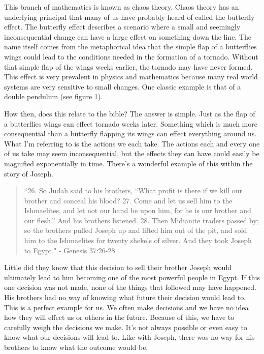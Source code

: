 \documentclass[10pt]{article}
\begin{document}
\begin{multicols}{2}
This branch of mathematics is known as chaos theory. Chaos theory has an underlying principal that many of us have probably heard of called the butterfly effect. The butterfly effect describes a scenario where a small and seemingly inconsequential change can have a large effect on something down the line. The name itself comes from the metaphorical idea that the simple flap of a butterflies wings could lead to the conditions needed in the formation of a tornado. Without that simple flap of the wings weeks earlier, the tornado may have never formed. This effect is very prevalent in physics and mathematics because many real world systems are very sensitive to small changes. One classic example is that of a double pendulum (see figure 1).

How then, does this relate to the bible? The answer is simple. Just as the flap of a butterflies wings can effect tornado weeks later. Something which is much more consequential than a butterfly flapping its wings can effect everything around us. What I'm referring to is the actions we each take. The actions each and every one of us take may seem inconsequential, but the effects they can have could easily be magnified exponentially in time. There's a wonderful example of this within the story of Joseph.

\begin{quotation}
``26. So Judah said to his brothers, “What profit is there if we kill our brother and conceal his blood? 27. Come and let us sell him to the Ishmaelites, and let not our hand be upon him, for he is our brother and our flesh.” And his brothers listened. 28. Then Midianite traders passed by; so the brothers pulled Joseph up and lifted him out of the pit, and sold him to the Ishmaelites for twenty shekels of silver. And they took Joseph to Egypt." - Genesis 37:26-28
\end{quotation}

Little did they know that this decision to sell their brother Joseph would ultimately lead to him becoming one of the most powerful people in Egypt. If this one decision was not made, none of the things that followed may have happened. His brothers had no way of knowing what future their decision would lead to. This is a perfect example for us. We often make decisions and we have no idea how they will effect us or others in the future. Because of this, we have to carefully weigh the decisions we make. It's not always possible or even easy to know what our decisions will lead to. Like with Joseph, there was no way for his brothers to know what the outcome would be.


\end{multicols}
\end{document}

